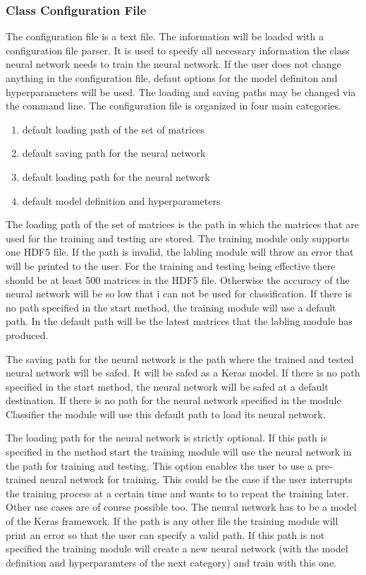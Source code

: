 \documentclass[parskip=full]{scrartcl}
\begin{document}
\subsubsection{Class Configuration File}
The configuration file is a text file. The information will be loaded with a configuration file parser.
It is used to specify all necessary information the class \gls{neural network} needs to train the neural network.
If the user does not change anything in the configuration file, defaut options for the model definiton and hyperparameters will be used.
The loading and saving paths may be changed via the command line. The configuration file is organized in four main categories.
\begin{enumerate}
\item default loading path of the set of matrices 
\item default saving path for the \gls{neural network}
\item default loading path for the \gls{neural network}
\item default model definition and hyperparameters
\end{enumerate}
The loading path of the set of matrices is the path in which the matrices that are used for the training and testing are stored.
The training module only supports one \gls{HDF5} file.
If the path is invalid, the labling module will throw an error that will be printed to the user.
For the training and testing being effective there should be at least 500 matrices in the \gls{HDF5} file.
Otherwise the accuracy of the \gls{neural network} will be so low that i can not be used for classification.
If there is no path specified in the start method, the training module will use a default path.
In the default path will be the latest matrices that the labling module has produced. \newline

The saving path for the \gls{neural network} is the path where the trained and tested \gls{neural network} will be safed.
It will be safed as a Keras model.
If there is no path specified in the start method, the \gls{neural network} will be safed at a default destination.
If there is no path for the \gls{neural network} specified in the module Classifier the module will use this default path to load its \gls{neural network}.\newline

The loading path for the \gls{neural network} is strictly optional.
If this path is specified in the method start the training module will use the \gls{neural network} in the path for training and testing.
This option enables the user to use a pre-trained \gls{neural network} for training.
This could be the case if the user interrupts the training process at a certain time and wants to to repeat the training later.
Other use cases are of course possible too.
The \gls{neural network} has to be a model of the Keras framework.
If the path is any other file the training module will print an error so that the user can specify a valid path.
If this path is not specified the training module will create a new \gls{neural network} (with the model definition and hyperparamters of the next category) and train with this one. \newline
\end{document}
